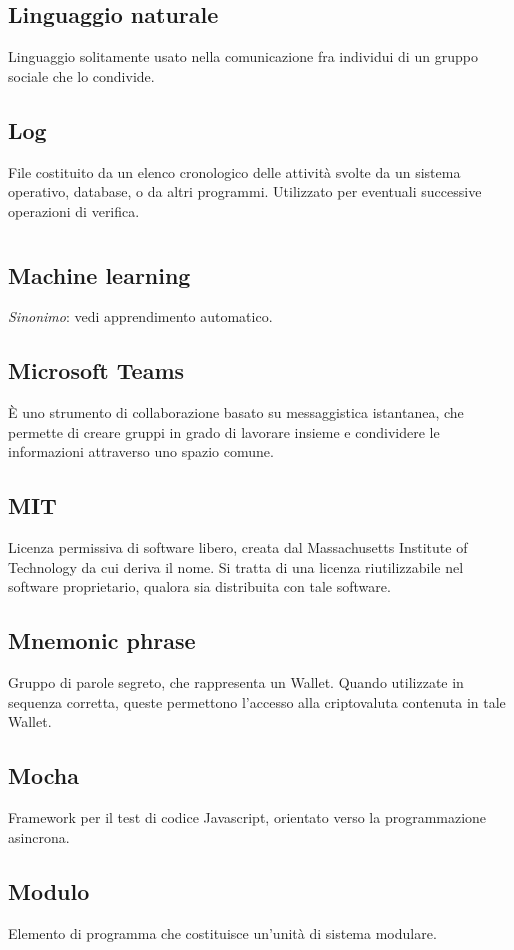 	\subsection*{Linguaggio naturale}
	Linguaggio solitamente usato nella comunicazione fra individui di un gruppo sociale che lo condivide.
	\subsection*{Log}
	File costituito da un elenco cronologico delle attività svolte da un sistema operativo, database, o da altri programmi. Utilizzato per eventuali successive operazioni di verifica.
\pagebreak
\section[M]{}
	\subsection*{Machine learning}
	\emph{Sinonimo}: vedi apprendimento automatico.
	\subsection*{Microsoft Teams}
	È uno strumento di collaborazione basato su messaggistica istantanea, che permette di creare gruppi in grado di lavorare insieme e condividere le informazioni attraverso uno spazio comune.
	\subsection*{MIT}
	Licenza permissiva di software libero, creata dal Massachusetts Institute of Technology da cui deriva il nome. Si tratta di una licenza riutilizzabile nel software proprietario, qualora sia distribuita con tale software.
	\subsection*{Mnemonic phrase}
	Gruppo di parole segreto, che rappresenta un Wallet. Quando utilizzate in sequenza corretta, queste permettono l’accesso alla criptovaluta contenuta in tale Wallet.
	\subsection*{Mocha}
	Framework per il test di codice Javascript, orientato verso la programmazione asincrona.
	\subsection*{Modulo}
	Elemento di programma che costituisce un’unità di sistema modulare.
